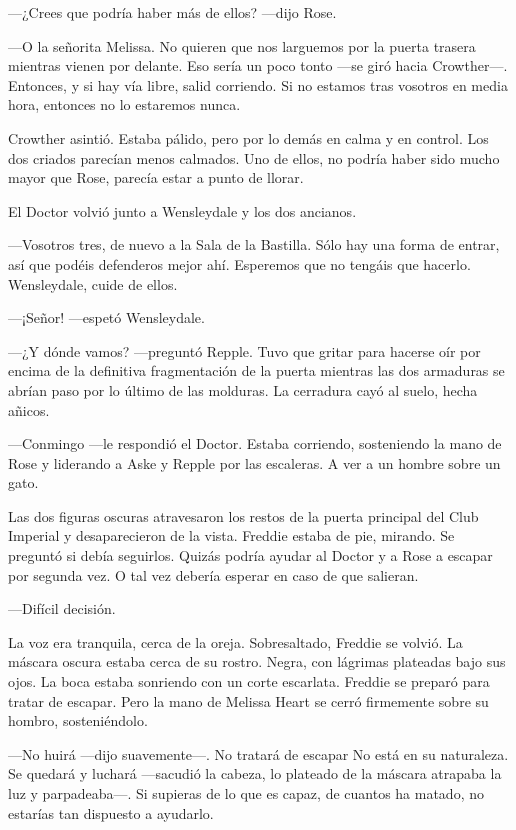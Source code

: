 {---¿Crees que podría haber más de ellos? ---dijo Rose. }

{---O la señorita Melissa. No quieren que nos larguemos por la puerta
	trasera mientras vienen por delante. Eso sería un poco tonto ---se giró
	hacia Crowther---. Entonces, y si hay vía libre, salid corriendo. Si no
estamos tras vosotros en media hora, entonces no lo estaremos nunca.}

{Crowther asintió. Estaba pálido, pero por lo demás en calma y en
	control. Los dos criados parecían menos calmados. Uno de ellos, no
	podría haber sido mucho mayor que Rose, parecía estar a punto de
llorar.}

{El Doctor volvió junto a Wensleydale y los dos ancianos. }

{---Vosotros tres, de nuevo a la Sala de la Bastilla. Sólo hay una forma
	de entrar, así que podéis defenderos mejor ahí. Esperemos que no tengáis
que hacerlo. Wensleydale, cuide de ellos.}

{---¡Señor! ---espetó Wensleydale.}

{---¿Y dónde vamos? ---preguntó Repple. Tuvo que gritar para hacerse oír
	por encima de la definitiva fragmentación de la puerta mientras las dos
	armaduras se abrían paso por lo último de las molduras. La cerradura
cayó al suelo, hecha añicos.}

{---Conmingo ---le respondió el Doctor. Estaba corriendo, sosteniendo la
	mano de Rose y liderando a Aske y Repple por las escaleras. A ver a un
hombre sobre un gato.}

{Las dos figuras oscuras atravesaron los restos de la puerta principal
	del Club Imperial y desaparecieron de la vista. Freddie estaba de pie,
	mirando. Se preguntó si debía seguirlos. Quizás podría ayudar al Doctor
	y a Rose a escapar por segunda vez. O tal vez debería esperar en caso de
que salieran.}

{---Difícil decisión.}

{La voz era tranquila, cerca de la oreja. Sobresaltado, Freddie se
	volvió. La máscara oscura estaba cerca de su rostro. Negra, con lágrimas
	plateadas bajo sus ojos. La boca estaba sonriendo con un corte
	escarlata. Freddie se preparó para tratar de escapar. Pero la mano de
Melissa Heart se cerró firmemente sobre su hombro, sosteniéndolo.}

{---No huirá ---dijo suavemente---. No tratará de escapar No está en su
	naturaleza. Se quedará y luchará ---sacudió la cabeza, lo plateado de la
	máscara atrapaba la luz y parpadeaba---. Si supieras de lo que es capaz,
de cuantos ha matado, no estarías tan dispuesto a ayudarlo.}

